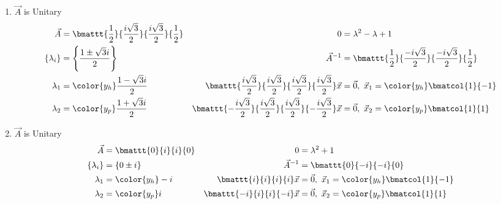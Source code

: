 \begin{enumerate}
    \item $\vec{A}$ is Unitary
          \begin{align}
              \vec{A}       & = \bmattt{\frac{1}{2}}{\frac{i\sqrt{3}}{2}}
              {\frac{i\sqrt{3}}{2}}
              {\frac{1}{2}} &
              0             & = \lambda^2 - \lambda + 1                      \\
              \{\lambda_i\} & = \Bigg\{\frac{1 \pm \sqrt{3}i}
              {2}\Bigg\}    &
              \vec{A}^{-1}  & = \bmattt{\frac{1}{2}}{\frac{-i\sqrt{3}}{2}}
              {\frac{-i\sqrt{3}}{2}}{\frac{1}{2}}                            \\
              \lambda_1     & = \color{y_h} \frac{1 - \sqrt{3}i}{2}        &
              \bmattt{\frac{i\sqrt{3}}{2}}{\frac{i\sqrt{3}}{2}}
              {\frac{i\sqrt{3}}{2}}{\frac{i\sqrt{3}}{2}}
              \vec{x}       & = \vec{0},\
              \vec{x}_1 = \color{y_h} \bmatcol{1}{-1}                        \\
              \lambda_2     & = \color{y_p} \frac{1 + \sqrt{3}i}{2}        &
              \bmattt{-\frac{i\sqrt{3}}{2}}{\frac{i\sqrt{3}}{2}}
              {\frac{i\sqrt{3}}{2}}{-\frac{i\sqrt{3}}{2}}
              \vec{x}       & = \vec{0},\
              \vec{x}_2 = \color{y_p} \bmatcol{1}{1}
          \end{align}

    \item $\vec{A}$ is Unitary
          \begin{align}
              \vec{A}                      & = \bmattt{0}{i}{i}{0}   &
              0                            & = \lambda^2 + 1           \\
              \{\lambda_i\}                & = \{0 \pm i\}           &
              \vec{A}^{-1}                 & = \bmattt{0}{-i}{-i}{0}   \\
              \lambda_1                    & = \color{y_h} -i        &
              \bmattt{i}{i}{i}{i}\vec{x}   & = \vec{0},\
              \vec{x}_1 = \color{y_h} \bmatcol{1}{-1}                  \\
              \lambda_2                    & = \color{y_p} i         &
              \bmattt{-i}{i}{i}{-i}\vec{x} & = \vec{0},\
              \vec{x}_2 = \color{y_p} \bmatcol{1}{1}
          \end{align}


\end{enumerate}

